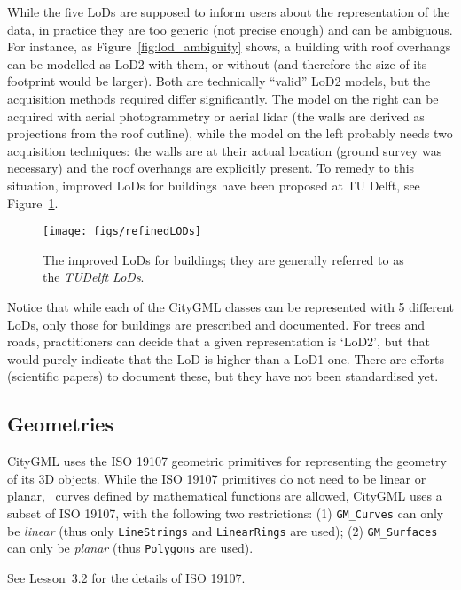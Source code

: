 %

While the five LoDs are supposed to inform users about the representation of the data, in practice they are too generic (not precise enough) and can be ambiguous. 
For instance, as Figure~\ref{fig:lod_ambiguity} shows,
a building with roof overhangs can be modelled as LoD2 with them, or without (and therefore the size of its footprint would be larger).
Both are technically ``valid'' LoD2 models, but the acquisition methods required differ significantly.
The model on the right can be acquired with aerial photogrammetry or aerial lidar (the walls are derived as projections from the roof outline), while the model on the left probably needs two acquisition techniques: the walls are at their actual location (ground survey was necessary) and the roof overhangs are explicitly present.
To remedy to this situation, improved LoDs for buildings have been proposed at TU Delft, see Figure~\ref{fig:refinedLODs}.
\begin{figure}
  \centering
  \texttt{[image: figs/refinedLODs]}
  \caption{The improved LoDs for buildings; they are generally referred to as the \emph{TUDelft LoDs}.}%
\label{fig:refinedLODs}
\end{figure}

%

Notice that while each of the CityGML classes can be represented with 5 different LoDs, only those for buildings are prescribed and documented.
For trees and roads, practitioners can decide that a given representation is `LoD2', but that would purely indicate that the LoD is higher than a LoD1 one.
There are efforts (scientific papers) to document these, but they have not been standardised yet.


\subsection{Geometries}

CityGML uses the ISO 19107 geometric primitives for representing the geometry of its 3D objects.
While the ISO 19107 primitives do not need to be linear or planar, \ie\ curves defined by mathematical functions are allowed, CityGML uses a subset of ISO 19107, with the following two restrictions: (1) \texttt{GM\_Curves} can only be \emph{linear} (thus only \texttt{LineStrings} and \texttt{LinearRings} are used); (2) \texttt{GM\_Surfaces} can only be \emph{planar} (thus \texttt{Polygons} are used).

See Lesson~3.2 for the details of ISO 19107.


